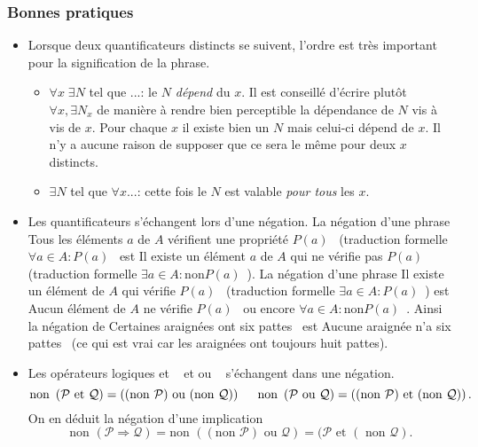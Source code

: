 \subsubsection{Bonnes pratiques}
\begin{itemize}
  \item Lorsque deux quantificateurs distincts se suivent, l'ordre est très important pour la signification de la phrase.
  \begin{itemize}
    \item \og$\forall x \;\exists N$ tel que ...\fg: le $N$ \emph{dépend} du $x$. Il est conseillé d'écrire plutôt $\forall x, \exists N_x$ de manière à rendre bien perceptible la dépendance de $N$ vis à vis de $x$. Pour chaque $x$ il existe bien un $N$ mais celui-ci dépend de $x$. Il n'y a aucune raison de supposer que ce sera le même pour deux $x$ distincts.
    \item \og$\exists N$ tel que $\forall x  ...$\fg: cette fois le $N$ est valable \emph{pour tous} les $x$. 
  \end{itemize}

  \item Les quantificateurs s'échangent lors d'une négation.\newline
La négation d'une phrase \og Tous les éléments $a$ de $A$ vérifient une propriété $P(a)$\fg~ (traduction formelle \og $\forall a \in A : P(a)$\fg~ est \og Il existe un élément $a$ de $A$ qui ne vérifie pas $P(a)$  (traduction formelle \og $\exists a \in A : \mathrm{non}P(a)$\fg~).\newline
La négation d'une phrase \og Il existe un élément de $A$ qui vérifie $P(a)$\fg~ (traduction formelle \og $\exists a \in A : P(a)$\fg~) est \og Aucun élément de $A$ ne vérifie $P(a)$\fg~ ou encore \og $\forall a \in A : \mathrm{non} P(a)$\fg~.\newline
Ainsi la négation de \og Certaines araignées ont six pattes\fg~ est \og Aucune araignée n'a six pattes\fg~ (ce qui est vrai car les araignées ont toujours huit pattes).

  \item Les opérateurs logiques \og et \fg~ et \og ou \fg~ s'échangent dans une négation.
\[
  \text{non }\left( \mathcal{P} \text{ et } \mathcal{Q}\right) 
  = \left( (\text{non }\mathcal{P}) \text{ ou } (\text{non }\mathcal{Q})\right)
  \hspace{0.5cm}
  \text{non }\left( \mathcal{P} \text{ ou } \mathcal{Q}\right) 
  = \left( (\text{non }\mathcal{P}) \text{ et } (\text{non }\mathcal{Q})\right).
\]
  On en déduit la négation d'une implication
\[
  \text{non }(\mathcal{P} \Rightarrow \mathcal{Q}) 
  = \text{non }((\text{non }\mathcal{P}) \text{ ou } \mathcal{Q})
  = ( \mathcal{P} \text{ et } (\text{ non } \mathcal{Q}).
\]


\end{itemize}
